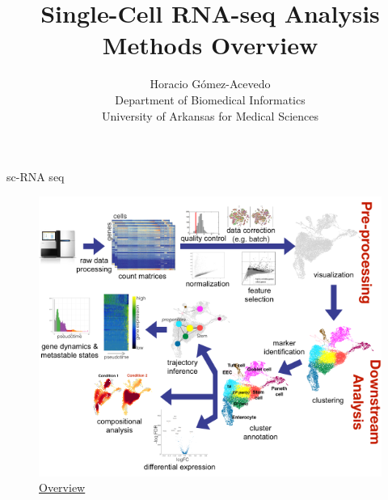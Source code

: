 \documentclass{beamer}
\title{Single-Cell RNA-seq Analysis\\ Methods Overview}
\author{Horacio G\'omez-Acevedo\\ Department of Biomedical Informatics\\
	University of Arkansas for Medical Sciences}
\begin{document}
	\begin{frame}[plain]
		\maketitle
	\end{frame}
	\begin{frame}{sc-RNA seq}
		
\begin{figure}[h]
	\centering
	\includegraphics[scale=0.25]{../../Figures/scrnaseq_overview.png}
	\caption{\href{https://github.com/theislab/single-cell-tutorial}{Overview}}
\end{figure}
\end{frame}
\end{document}
